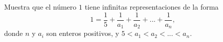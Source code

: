 Muestra que el número $1$ tiene infinitas representaciones de la forma
\[ 1 =\frac{1}{5}+\frac{1}{a_1}+\frac{1}{a_2}+ ...+\frac{1}{a_n}, \]
donde $n$ y $a_i$ son enteros positivos, y $5<a_1<a_2<...<a_n$.
